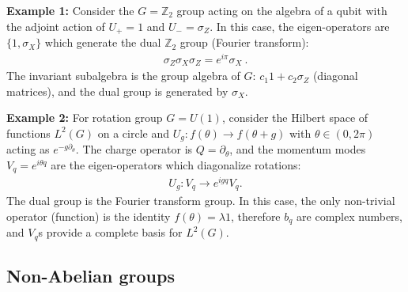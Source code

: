 \documentclass{article}
\theoremstyle{definition}
\begin{document}
{\bf Example 1:} Consider the $G=\mathbb{Z}_2$ group acting on the algebra of a qubit with the adjoint action of $U_+=1$ and $U_-=\sigma_Z$. In this case, the eigen-operators are $\{1,\sigma_X\}$ which generate the dual $\mathbb{Z}_2$ group (Fourier transform):
\begin{align}
    \sigma_Z \sigma_X \sigma_Z=e^{i \pi}\sigma_X\ .
\end{align}
The invariant subalgebra is the group algebra of $G$: $c_1 1+c_2 \sigma_Z$ (diagonal matrices), and the dual group is generated by $\sigma_X$.

{\bf Example 2:} For rotation group $G=U(1)$, consider the Hilbert space of functions $L^2(G)$ on a circle and $U_g:f(\theta)\to f(\theta+g)$ with $\theta\in(0,2\pi)$ acting as  $e^{-g \partial_\theta}$. The charge operator is $Q=\partial_\theta$, and the momentum modes $V_q=e^{i\theta q}$ are the eigen-operators which diagonalize rotations:
\begin{align}
    U_g: V_q \to e^{i g q} V_q.
\end{align}
The dual group is the Fourier transform group. In this case, the only non-trivial operator (function) is the identity $f(\theta)= \lambda 1$, therefore $b_q$ are complex numbers, and $V_q$s provide a complete basis for $L^2(G)$. 



\subsection{Non-Abelian groups}
\end{document}
